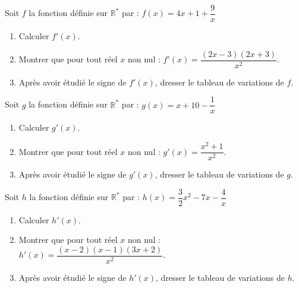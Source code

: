 \documentclass[french]{book}
\begin{document}
\begin{exocor}
Soit $f$ la fonction définie sur $\mathbb{R}^*$ par : $f(x)=4x+1+\dfrac{9}{x}$

\begin{enumerate}
\item Calculer $f'(x)$.
\item Montrer que pour tout réel $x$ non nul : $f'(x)=\dfrac{(2x-3)(2x+3)}{x^2}$.
\item Après avoir étudié le signe de $f'(x)$, dresser le tableau de variations de $f$.
\end{enumerate}
\end{exocor}

\begin{exocor}
Soit $g$ la fonction définie sur $\mathbb{R}^*$ par : $g(x)=x+10-\dfrac{1}{x}$

\begin{enumerate}
\item Calculer $g'(x)$.
\item Montrer que pour tout réel $x$ non nul : $g'(x)=\dfrac{x^2+1}{x^2}$.
\item Après avoir étudié le signe de $g'(x)$, dresser le tableau de variations de $g$.
\end{enumerate}
\end{exocor}

\begin{exocor}
Soit $h$ la fonction définie sur $\mathbb{R}^*$ par : $h(x)=\dfrac{3}{2}x^2-7x-\dfrac{4}{x}$

\begin{enumerate}
\item Calculer $h'(x)$.
\item Montrer que pour tout réel $x$ non nul : $h'(x)=\dfrac{(x-2)(x-1)(3x+2)}{x^2}$.
\item Après avoir étudié le signe de $h'(x)$, dresser le tableau de variations de $h$.
\end{enumerate}
\end{exocor}

\vfill
\end{document}
